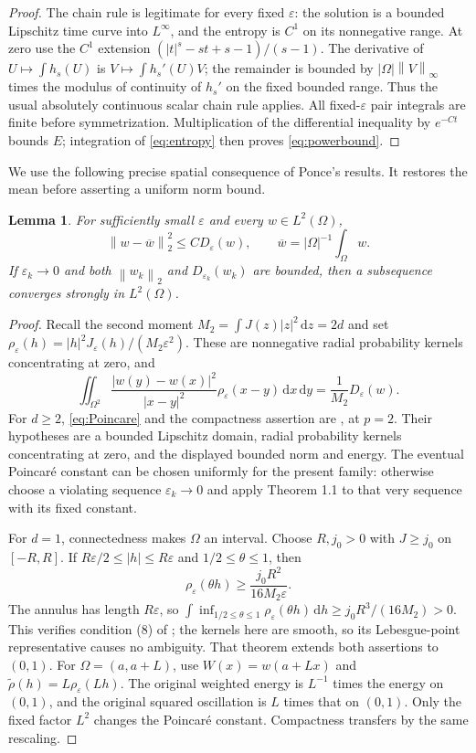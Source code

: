 \documentclass[11pt]{article}
\newtheorem{lemma}[theorem]{Lemma}
\newcommand{\eps}{\varepsilon}
\newcommand{\dd}{\,\mathrm d}
\newcommand{\Om}{\Omega}
\newcommand{\De}{D_\eps}
\newcommand{\norm}[1]{\left\lVert#1\right\rVert}
\newcommand{\av}[1]{\overline{#1}}
\begin{document}
\begin{proof}
The chain rule is legitimate for every fixed $\eps$: the solution is a
bounded Lipschitz time curve into $L^\infty$, and the entropy is $C^1$ on
its nonnegative range. At zero use the $C^1$ extension
$(|t|^s-st+s-1)/(s-1)$. The derivative of $U\mapsto\int h_s(U)$ is
$V\mapsto\int h_s'(U)V$; the remainder is bounded by
$|\Om|\norm{V}_\infty$ times the modulus of continuity of $h_s'$ on the
fixed bounded range. Thus the usual absolutely continuous scalar chain rule
applies. All fixed-$\eps$ pair integrals are finite before symmetrization.
Multiplication of the differential inequality by $e^{-Ct}$ bounds $E$;
integration of \eqref{eq:entropy} then proves \eqref{eq:powerbound}.
\end{proof}

We use the following precise spatial consequence of Ponce's results. It
restores the mean before asserting a uniform norm bound.

\begin{lemma}\label{lem:Ponce}
For sufficiently small $\eps$ and every $w\in L^2(\Om)$,
\begin{equation}\label{eq:Poincare}
 \norm{w-\av w}_2^2\leq C\De(w),\qquad
 \av w=|\Om|^{-1}\int_\Om w.
\end{equation}
If $\eps_k\to0$ and both $\norm{w_k}_2$ and $D_{\eps_k}(w_k)$ are bounded,
then a subsequence converges strongly in $L^2(\Om)$.
\end{lemma}
\begin{proof}
Recall the second moment $M_2=\int J(z)|z|^2\dd z=2d$ and set
$\rho_\eps(h)=|h|^2J_\eps(h)/(M_2\eps^2)$.
These are nonnegative radial probability kernels concentrating at zero, and
\[
 \iint_{\Om^2}\frac{|w(y)-w(x)|^2}{|x-y|^2}\rho_\eps(x-y)\dd x\dd y
                 =\frac1{M_2}\De(w).
\]
For $d\geq2$, \eqref{eq:Poincare} and the compactness assertion are
\cite[Theorems 1.1--1.2]{Ponce}, at $p=2$.
Their hypotheses are a bounded Lipschitz domain, radial probability kernels
concentrating at zero, and the displayed bounded norm and energy.
The eventual Poincar\'e constant can be chosen uniformly for the present
family: otherwise choose a violating sequence $\eps_k\to0$ and apply
Theorem 1.1 to that very sequence with its fixed constant.

For $d=1$, connectedness makes $\Om$ an interval. Choose $R,j_0>0$ with
$J\geq j_0$ on $[-R,R]$. If $R\eps/2\leq |h|\leq R\eps$ and
$1/2\leq\theta\leq1$, then
\[
 \rho_\eps(\theta h)\geq\frac{j_0R^2}{16M_2\eps}.
\]
The annulus has length $R\eps$, so
$\int\inf_{1/2\leq\theta\leq1}\rho_\eps(\theta h)\dd h
\geq j_0R^3/(16M_2)>0$.
This verifies condition (8) of \cite[Theorem 1.3]{Ponce}; the kernels here
are smooth, so its Lebesgue-point representative causes no ambiguity.
That theorem extends both assertions to $(0,1)$. For
$\Om=(a,a+L)$, use $W(x)=w(a+Lx)$ and
$\widetilde\rho(h)=L\rho_\eps(Lh)$. The original weighted energy is
$L^{-1}$ times the energy on $(0,1)$, and the original squared oscillation
is $L$ times that on $(0,1)$. Only the fixed factor $L^2$ changes the
Poincar\'e constant. Compactness transfers by the same rescaling.
\end{proof}
\end{document}
